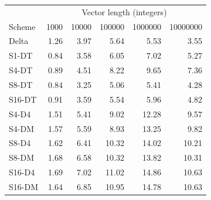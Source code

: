 \begin{tabular}{lrrrrr}
\toprule
 & \multicolumn{5}{c}{Vector length (integers)} \\
Scheme & 1000 & 10000 & 100000 & 1000000 & 10000000 \\
\midrule
Delta & 1.26 & 3.97 & 5.64 & 5.53 & 3.55 \\
S1-DT & 0.84 & 3.58 & 6.05 & 7.02 & 5.27 \\
S4-DT & 0.89 & 4.51 & 8.22 & 9.65 & 7.36 \\
S8-DT & 0.84 & 3.25 & 5.06 & 5.41 & 4.28 \\
S16-DT & 0.91 & 3.59 & 5.54 & 5.96 & 4.82 \\
S4-D4 & 1.51 & 5.41 & 9.02 & 12.28 & 9.57 \\
S4-DM & 1.57 & 5.59 & 8.93 & 13.25 & 9.82 \\
S8-D4 & 1.62 & 6.41 & 10.32 & 14.02 & 10.21 \\
S8-DM & 1.68 & 6.58 & 10.32 & 13.82 & 10.31 \\
S16-D4 & 1.69 & 7.02 & 11.02 & 14.86 & 10.63 \\
S16-DM & 1.64 & 6.85 & 10.95 & 14.78 & 10.63 \\
\bottomrule
\end{tabular}
